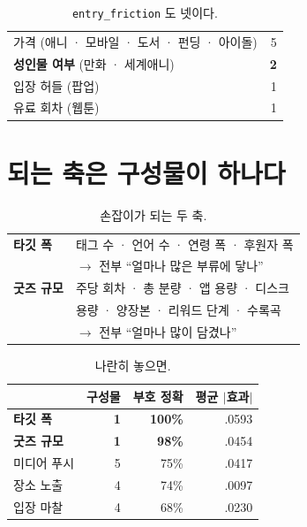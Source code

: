 \documentclass[10pt]{article}
\begin{document}

\begin{table}[t]
\centering\tsize
\caption{\texttt{entry\_friction} 도 넷이다.}
\begin{tabular}{lr}
\toprule
가격 (애니 · 모바일 · 도서 · 펀딩 · 아이돌) & 5 \\
\textbf{성인물 여부} (만화 · 세계애니) & \textbf{2} \\
입장 허들 (팝업) & 1 \\
유료 회차 (웹툰) & 1 \\
\bottomrule
\end{tabular}
\end{table}

\section{되는 축은 구성물이 하나다}

\begin{table}[t]
\centering\tsize
\caption{손잡이가 되는 두 축.}
\begin{tabular}{ll}
\toprule
\textbf{타깃 폭} & 태그 수 · 언어 수 · 연령 폭 · 후원자 폭 \\
& $\to$ 전부 ``얼마나 많은 부류에 닿나'' \\
\midrule
\textbf{굿즈 규모} & 주당 회차 · 총 분량 · 앱 용량 · 디스크 \\
& 용량 · 양장본 · 리워드 단계 · 수록곡 \\
& $\to$ 전부 ``얼마나 많이 담겼나'' \\
\bottomrule
\end{tabular}
\end{table}

\begin{table}[t]
\centering\tsize
\caption{나란히 놓으면.}
\begin{tabular}{lrrr}
\toprule
& 구성물 & 부호 정확 & 평균 $|$효과$|$ \\
\midrule
\textbf{타깃 폭} & \textbf{1} & \textbf{100\%} & .0593 \\
\textbf{굿즈 규모} & \textbf{1} & \textbf{98\%} & .0454 \\
미디어 푸시 & 5 & 75\% & .0417 \\
장소 노출 & 4 & 74\% & .0097 \\
입장 마찰 & 4 & 68\% & .0230 \\
\bottomrule
\end{tabular}
\end{table}
\end{document}
